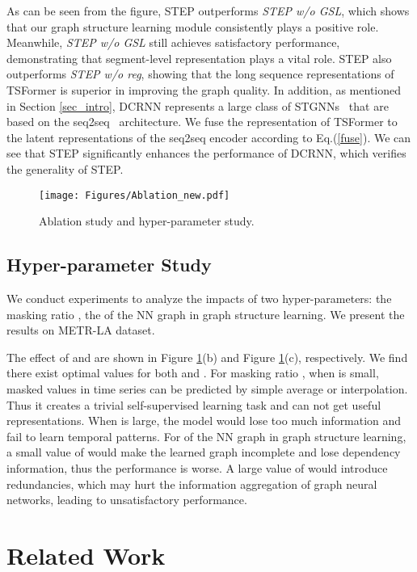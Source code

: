 \documentclass[sigconf]{acmart}
\begin{document}
As can be seen from the figure, STEP outperforms \textit{STEP w/o GSL}, which shows that our graph structure learning module consistently plays a positive role.
Meanwhile, \textit{STEP w/o GSL} still achieves satisfactory performance, demonstrating that segment-level representation plays a vital role.
STEP also outperforms \textit{STEP w/o reg}, showing that the long sequence representations of TSFormer is superior in improving the graph quality.
In addition, as mentioned in Section \ref{sec_intro}, DCRNN represents a large class of STGNNs~\cite{2019STMetaNet, 2021GTS, 2021REST, 2020GMAN} that are based on the seq2seq~\cite{2014Seq2Seq} architecture.
We fuse the representation of TSFormer to the latent representations of the seq2seq encoder according to Eq.(\ref{fuse}).
We can see that STEP significantly enhances the performance of DCRNN, which verifies the generality of STEP.

\begin{figure}
    \setlength{\abovecaptionskip}{0.0cm}
    \setlength{\belowcaptionskip}{-0.4cm}
  \centering
  \texttt{[image: Figures/Ablation\_new.pdf]}
  \caption{Ablation study and hyper-parameter study.}
  \label{ablation}
\end{figure}

\subsection{Hyper-parameter Study}
{\color{black}
We conduct experiments to analyze the impacts of two hyper-parameters: the masking ratio , the  of the NN graph in graph structure learning. We present the results on METR-LA dataset.

The effect of  and  are shown in Figure \ref{ablation}(b) and Figure \ref{ablation}(c), respectively. We find there exist optimal values for both  and . 
For masking ratio , when  is small, masked values in time series can be predicted by simple average or interpolation. Thus it creates a trivial self-supervised learning task and can not get useful representations. 
When  is large, the model would lose too much information and fail to learn temporal patterns. For  of the NN graph in graph structure learning, a small value of  would make the learned graph incomplete and lose dependency information, thus the performance is worse. A large value of  would introduce redundancies, which may hurt the information aggregation of graph neural networks, leading to unsatisfactory performance. } \section{Related Work}
\end{document}
